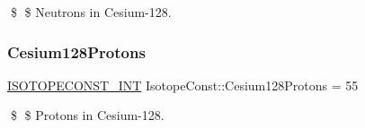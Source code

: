 \$ \$ Neutrons in Cesium-\/128. \mbox{\label{group___isotope_const-_cesium-_cs128_ga0ab0139a257bd94497ed5d7f41b2ff56}} 
\subsubsection{\texorpdfstring{Cesium128\+Protons}{Cesium128Protons}}
{\footnotesize\ttfamily \mbox{\hyperlink{group___isotope_const-_macros_ga5f18360b3e99483a35c32d789e62621c}{I\+S\+O\+T\+O\+P\+E\+C\+O\+N\+S\+T\+\_\+\+I\+NT}} Isotope\+Const\+::\+Cesium128\+Protons = 55}

\$ \$ Protons in Cesium-\/128. 